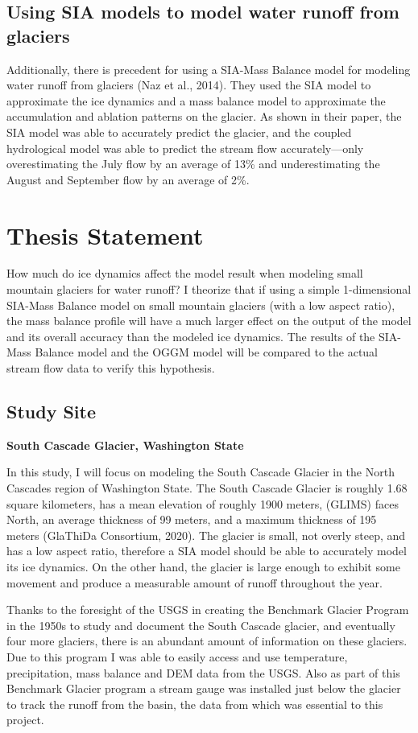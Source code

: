 \documentclass{article}
\begin{document}
\subsection{Using SIA models to model water runoff from glaciers}
    Additionally, there is precedent for using a SIA-Mass Balance model for modeling water runoff from glaciers (Naz et al., 2014). They used 
the SIA model to approximate the ice dynamics and a mass balance model to approximate the accumulation and ablation patterns on the glacier. 
As shown in their paper, the SIA model was able to accurately predict the glacier, and the coupled hydrological model was able to predict 
the stream flow accurately---only overestimating the July flow by an average of 13\% and underestimating the August and September flow by an 
average of 2\%.

\section{Thesis Statement}
How much do ice dynamics affect the model result when modeling small mountain glaciers for water runoff? I theorize that if using a simple 
1-dimensional SIA-Mass Balance model on small mountain glaciers (with a low aspect ratio), the mass balance profile will have a 
much larger effect on the output of the model and its overall accuracy than the modeled ice dynamics. The results of the SIA-Mass Balance 
model and the OGGM model will be compared to the actual stream flow data to verify this hypothesis.
\subsection{Study Site}
\textbf{\large South Cascade Glacier, Washington State}

In this study, I will focus on modeling the South Cascade Glacier in the North Cascades region of Washington State. The South Cascade Glacier is 
roughly 1.68 square kilometers, has a mean elevation of roughly 1900 meters, (GLIMS) faces North, an average thickness of 99 meters, and a 
maximum thickness of 195 meters (GlaThiDa Consortium, 2020). The glacier is small, not overly steep, and has a low aspect ratio, therefore a
SIA model should be able to accurately model its ice dynamics. On the other hand, the glacier is large enough to exhibit some movement 
and produce a measurable amount of runoff throughout the year. 

Thanks to the foresight of the USGS in creating the Benchmark Glacier Program in the 1950s to study and document the South Cascade glacier, 
and eventually four more glaciers, there is an abundant amount of information on these glaciers. Due to this program I was able to 
easily access and use temperature, precipitation, mass balance and DEM data from the USGS. Also as part of this Benchmark Glacier program a 
stream gauge was installed just below the glacier to track the runoff from the basin, the data from which was essential to this project.
\end{document}
